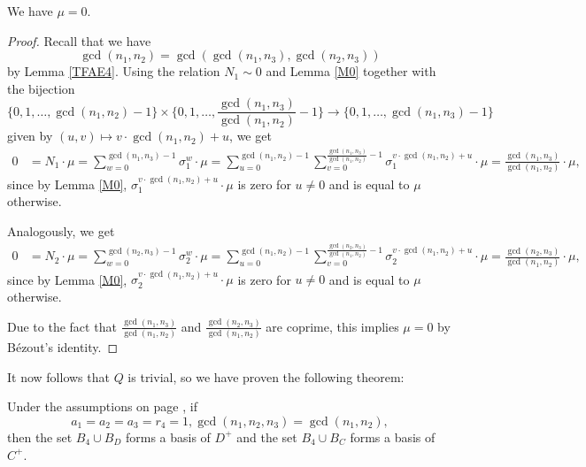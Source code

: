 \begin{prop}
We have $\mu=0.$
\end{prop}
\begin{proof}
Recall that we have $$\gcd(n_1,n_2)=\gcd(\gcd(n_1,n_3),\gcd(n_2,n_3))$$ by Lemma \ref{TFAE4}. Using the relation $N_1\sim 0$ and Lemma \ref{M0} together with the bijection $$\{0,1,\dots,\gcd(n_1,n_2)-1\}\times \{0,1,\dots,\frac{\gcd(n_1,n_3)}{\gcd(n_1,n_2)}-1\}\to \{0,1,\dots, \gcd(n_1,n_3)-1\}$$
given by $(u,v)\mapsto v\cdot \gcd(n_1,n_2)+u$, we get
\begin{align*}
0&=N_1\cdot \mu=\sum_{w=0}^{\gcd(n_1,n_3)-1}\sigma_1^w\cdot \mu=\sum_{u=0}^{\gcd(n_1,n_2)-1}\sum_{v=0}^{\frac{\gcd(n_1,n_3)}{\gcd(n_1,n_2)}-1}\sigma_1^{ v\cdot \gcd(n_1,n_2)+u}\cdot \mu
=\frac{\gcd(n_1,n_3)}{\gcd(n_1,n_2)}\cdot \mu,
\end{align*}
since by Lemma \ref{M0}, $\sigma_1^{ v\cdot \gcd(n_1,n_2)+u}\cdot \mu$ is zero for $u\neq 0$ and is equal to $\mu$ otherwise.

Analogously, we get 
\begin{align*}
0&=N_2\cdot \mu=\sum_{w=0}^{\gcd(n_2,n_3)-1}\sigma_2^w\cdot \mu=\sum_{u=0}^{\gcd(n_1,n_2)-1}\sum_{v=0}^{\frac{\gcd(n_2,n_3)}{\gcd(n_1,n_2)}-1}\sigma_2^{ v\cdot \gcd(n_1,n_2)+u}\cdot \mu
=\frac{\gcd(n_2,n_3)}{\gcd(n_1,n_2)}\cdot \mu,
\end{align*}
since by Lemma \ref{M0}, $\sigma_2^{ v\cdot \gcd(n_1,n_2)+u}\cdot \mu$ is zero for $u\neq 0$ and is equal to $\mu$ otherwise.

Due to the fact that $\frac{\gcd(n_1,n_3)}{\gcd(n_1,n_2)}$ and $\frac{\gcd(n_2,n_3)}{\gcd(n_1,n_2)}$ are coprime, this implies $\mu=0$ by Bézout's identity.
\end{proof}

It now follows that $Q$ is trivial, so we have proven the following theorem:
\begin{theorem}
Under the assumptions on page \pageref{assum}, if $$a_1=a_2=a_3=r_4=1,\gcd(n_1,n_2,n_3)=\gcd(n_1,n_2),$$ then the set $B_{4}\cup B_D$ forms a basis of $D^+$ and the set $B_{4}\cup B_C$ forms a basis of $C^+$.
\end{theorem}

